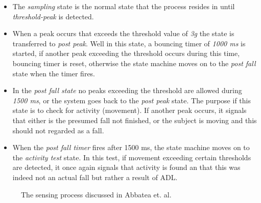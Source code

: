 \documentclass[12pt, a4paper, onecolumn]{article}
\begin{document}
		\begin{itemize}
			\item The \textit{sampling} state is the normal state that the process resides in until \textit{threshold-peak} is detected.
			
			\item When a peak occurs that exceeds the threshold value of \textit{3g} the state is transferred to \textit{post peak}. Well in this state, a bouncing timer of \textit{1000 ms} is started, if another peak exceeding the threshold occurs during this time, bouncing timer is reset, otherwise the state machine moves on to the \textit{post fall} state when the timer fires.

			\item In the \textit{post fall state} no peaks exceeding the threshold are allowed during \textit{1500 ms}, or the system goes back to the \textit{post peak} state. The purpose if this state is to check for activity (movement). If another peak occurs, it signals that either is the presumed fall not finished, or the subject is moving and this should not regarded as a fall. 
			
			\item When the \textit{post fall timer} fires after 1500 ms, the state machine moves on to the \textit{activity test} state. In this test, if movement exceeding certain thresholds are detected, it once again signals that activity is found an that this was indeed not an actual fall but rather a result of ADL. 

		\end{itemize}  
	
	
			\begin{figure}[h]
			\centering
			\caption{The sensing process discussed in Abbatea et. al.}%
			\label{fig:example}%
			\end{figure}
\end{document}
